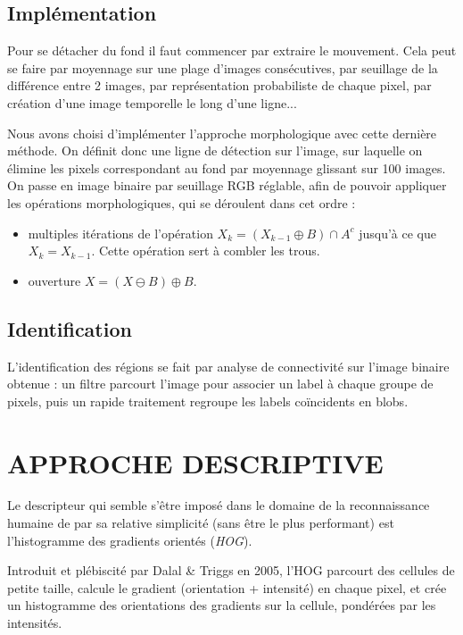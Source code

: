 \documentclass{article}
\begin{document}
	\subsection{Implémentation}
	Pour se détacher du fond il faut commencer par extraire le mouvement. Cela peut se faire par moyennage sur une plage d'images consécutives, par seuillage de la différence entre 2 images, par représentation probabiliste de chaque pixel, par création d'une image temporelle le long d'une ligne...
	
	Nous avons choisi d'implémenter l'approche morphologique avec cette dernière méthode. On définit donc une ligne de détection sur l'image, sur laquelle on élimine les pixels correspondant au fond par moyennage glissant sur 100 images. 
	On passe en image binaire par seuillage RGB réglable, afin de pouvoir appliquer les opérations morphologiques, qui se déroulent dans cet ordre :
	\begin{itemize}
	\item multiples itérations de l'opération $X_k = (X_{k-1} \oplus B) \cap A^c$ jusqu'à ce que $X_k = X_{k-1}$. Cette opération sert à combler les trous.
	\item ouverture $X = (X \ominus B) \oplus B$.
	\end{itemize}
	
	\subsection{Identification}
	L'identification des régions se fait par analyse de connectivité sur l'image binaire obtenue : un filtre parcourt l'image pour associer un label à chaque groupe de pixels, puis un rapide traitement regroupe les labels coïncidents en blobs.
	
	
\section{APPROCHE DESCRIPTIVE}
\label{sec:desc}

	Le descripteur qui semble s'être imposé dans le domaine de la reconnaissance humaine de par sa relative simplicité (sans être le plus performant) est l'histogramme des gradients orientés (\emph{HOG}).
	
	Introduit et plébiscité par Dalal \& Triggs \cite{HOG} en 2005, l'HOG parcourt des cellules de petite taille, calcule le gradient (orientation + intensité) en chaque pixel, et crée un histogramme des orientations des gradients sur la cellule, pondérées par les intensités.
	
\end{document}

